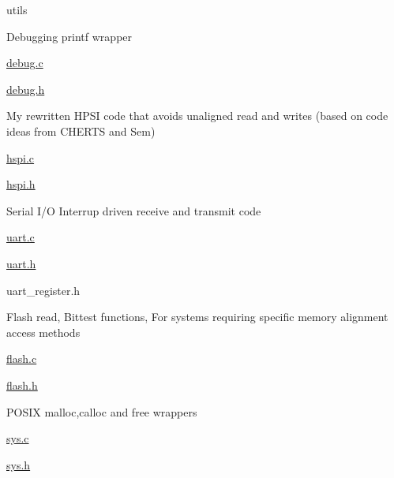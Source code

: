utils
\begin{DoxyItemize}
\item Debugging printf wrapper
\begin{DoxyItemize}
\item \hyperlink{debug_8c}{debug.\+c}
\item \hyperlink{debug_8h}{debug.\+h}
\end{DoxyItemize}
\item My rewritten H\+P\+SI code that avoids unaligned read and writes (based on code ideas from C\+H\+E\+R\+TS and Sem)
\begin{DoxyItemize}
\item \hyperlink{hspi_8c}{hspi.\+c}
\item \hyperlink{hspi_8h}{hspi.\+h}
\end{DoxyItemize}
\item Serial I/O Interrup driven receive and transmit code
\begin{DoxyItemize}
\item \hyperlink{uart_8c}{uart.\+c}
\item \hyperlink{uart_8h}{uart.\+h}
\item uart\+\_\+register.\+h
\end{DoxyItemize}
\item Flash read, Bittest functions, For systems requiring specific memory alignment access methods
\begin{DoxyItemize}
\item \hyperlink{flash_8c}{flash.\+c}
\item \hyperlink{flash_8h}{flash.\+h}
\end{DoxyItemize}
\item P\+O\+S\+IX malloc,calloc and free wrappers
\begin{DoxyItemize}
\item \hyperlink{sys_8c}{sys.\+c}
\item \hyperlink{sys_8h}{sys.\+h}
\end{DoxyItemize}
\end{DoxyItemize}

